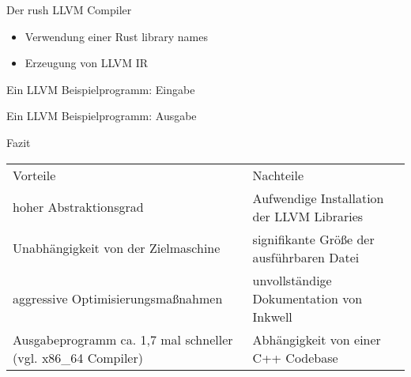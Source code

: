 \begin{frame}{Der rush LLVM Compiler}
	\begin{itemize}
		\item Verwendung einer Rust library names 
		\item Erzeugung von LLVM IR
	\end{itemize}
\end{frame}

\begin{frame}{Ein LLVM Beispielprogramm: Eingabe}
\end{frame}

\begin{frame}{Ein LLVM Beispielprogramm: Ausgabe}
\end{frame}

\begin{frame}{Fazit}
	\begin{table}[h]
		\begin{tabularx}{0.95\textwidth}{L|L}
			 Vorteile                                 &  Nachteile               \\
			hoher Abstraktionsgrad                                        & Aufwendige Installation der LLVM Libraries \\
			Unabhängigkeit von der Zielmaschine                           & signifikante Größe der ausführbaren Datei  \\
			aggressive Optimisierungsmaßnahmen                            & unvollständige Dokumentation von Inkwell   \\
			Ausgabeprogramm ca. 1,7 mal schneller (vgl. x86\_64 Compiler) & Abhängigkeit von einer C++ Codebase        \\
		\end{tabularx}
	\end{table}
\end{frame}
